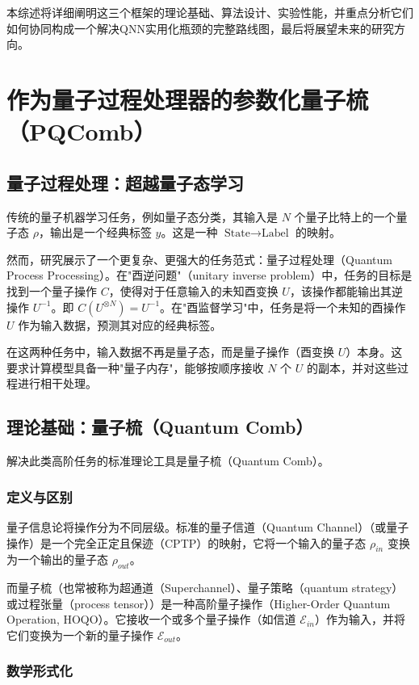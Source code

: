 \documentclass[12pt,a4paper]{article}
\begin{document}
本综述将详细阐明这三个框架的理论基础、算法设计、实验性能，并重点分析它们如何协同构成一个解决QNN实用化瓶颈的完整路线图，最后将展望未来的研究方向。

\section{作为量子过程处理器的参数化量子梳（PQComb）}

\subsection{量子过程处理：超越量子态学习}

传统的量子机器学习任务，例如量子态分类，其输入是 $N$ 个量子比特上的一个量子态 $\rho$，输出是一个经典标签 $y$。这是一种 $\text{State} \to \text{Label}$ 的映射。

然而，研究展示了一个更复杂、更强大的任务范式：量子过程处理（Quantum Process Processing）。在"酉逆问题"（unitary inverse problem）中，任务的目标是找到一个量子操作 $C$，使得对于任意输入的未知酉变换 $U$，该操作都能输出其逆操作 $U^{-1}$。即 $C(U^{\otimes N}) = U^{-1}$。在"酉监督学习"中，任务是将一个未知的酉操作 $U$ 作为输入数据，预测其对应的经典标签。

在这两种任务中，输入数据不再是量子态，而是量子操作（酉变换 $U$）本身。这要求计算模型具备一种"量子内存"，能够按顺序接收 $N$ 个 $U$ 的副本，并对这些过程进行相干处理。

\subsection{理论基础：量子梳（Quantum Comb）}

解决此类高阶任务的标准理论工具是量子梳（Quantum Comb）。

\subsubsection{定义与区别}

量子信息论将操作分为不同层级。标准的量子信道（Quantum Channel）（或量子操作）是一个完全正定且保迹（CPTP）的映射，它将一个输入的量子态 $\rho_{in}$ 变换为一个输出的量子态 $\rho_{out}$。

而量子梳（也常被称为超通道（Superchannel）、量子策略（quantum strategy）或过程张量（process tensor））是一种高阶量子操作（Higher-Order Quantum Operation, HOQO）。它接收一个或多个量子操作（如信道 $\mathcal{E}_{in}$）作为输入，并将它们变换为一个新的量子操作 $\mathcal{E}_{out}$。

\subsubsection{数学形式化}
\end{document}
